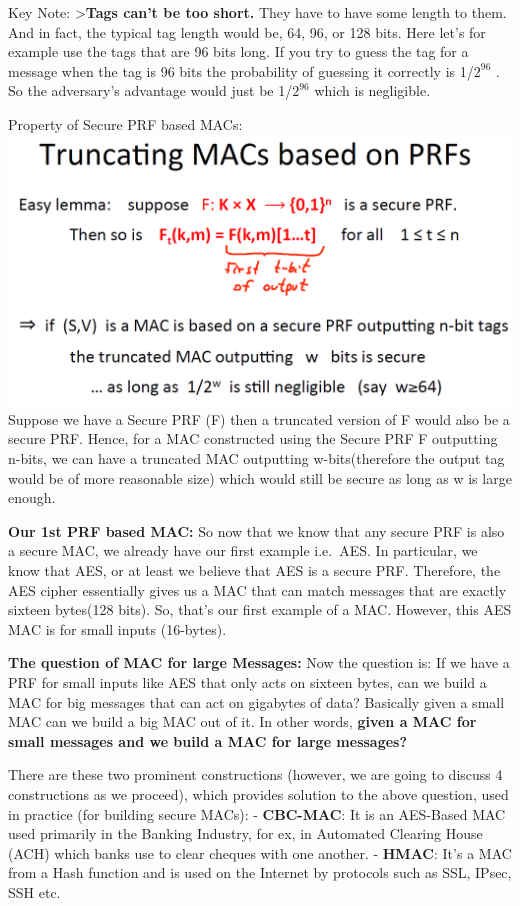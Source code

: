 \documentclass[11pt]{article}
\makeatletter
\def\maxwidth{\ifdim\Gin@nat@width>\linewidth\linewidth
    \else\Gin@nat@width\fi}
\let\Oldincludegraphics\includegraphics
\renewcommand{\includegraphics}[1]{\Oldincludegraphics[width=.8\maxwidth]{#1}}
\makeatother
\begin{document}
Key Note: \textgreater{}\textbf{Tags can't be too short.} They have to
have some length to them. And in fact, the typical tag length would be,
64, 96, or 128 bits. Here let's for example use the tags that are 96
bits long. If you try to guess the tag for a message when the tag is 96
bits the probability of guessing it correctly is 1/\(2^{96}\) . So the
adversary's advantage would just be 1/\(2^{96}\) which is negligible.

Property of Secure PRF based MACs:
\includegraphics{./Images/TruncateMACs.png} Suppose we have a Secure PRF
(F) then a truncated version of F would also be a secure PRF. Hence, for
a MAC constructed using the Secure PRF F outputting n-bits, we can have
a truncated MAC outputting w-bits(therefore the output tag would be of
more reasonable size) which would still be secure as long as
\textbar{}w\textbar{} is large enough.

\textbf{Our 1st PRF based MAC:} So now that we know that any secure PRF
is also a secure MAC, we already have our first example i.e.~AES. In
particular, we know that AES, or at least we believe that AES is a
secure PRF. Therefore, the AES cipher essentially gives us a MAC that
can match messages that are exactly sixteen bytes(128 bits). So, that's
our first example of a MAC. However, this AES MAC is for small inputs
(16-bytes).

\textbf{The question of MAC for large Messages:} Now the question is: If
we have a PRF for small inputs like AES that only acts on sixteen bytes,
can we build a MAC for big messages that can act on gigabytes of data?
Basically given a small MAC can we build a big MAC out of it. In other
words, \textbf{given a MAC for small messages and we build a MAC for
large messages?}

There are these two prominent constructions (however, we are going to
discuss 4 constructions as we proceed), which provides solution to the
above question, used in practice (for building secure MACs): -
\textbf{CBC-MAC}: It is an AES-Based MAC used primarily in the Banking
Industry, for ex, in Automated Clearing House (ACH) which banks use to
clear cheques with one another. - \textbf{HMAC}: It's a MAC from a Hash
function and is used on the Internet by protocols such as SSL, IPsec,
SSH etc.
\end{document}
